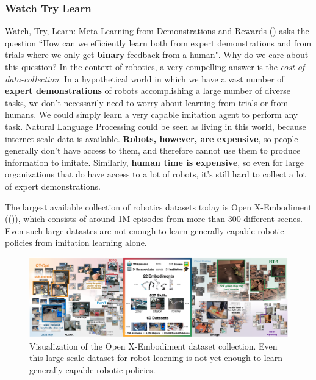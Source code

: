 \documentclass[
  letterpaper,
  DIV=11,
  numbers=noendperiod,
  oneside]{scrreprt}
\theoremstyle{remark}
\begin{document}
\subsubsection*{Watch Try Learn}\label{sec:watch}

Watch, Try, Learn: Meta-Learning from Demonstrations and Rewards
() asks the question ``How
can we efficiently learn both from expert demonstrations and from trials
where we only get \textbf{binary} feedback from a human". Why do we care
about this question? In the context of robotics, a very compelling
answer is the \emph{cost of data-collection}. In a hypothetical world in
which we have a vast number of \textbf{expert demonstrations} of robots
accomplishing a large number of diverse tasks, we don't necessarily need
to worry about learning from trials or from humans. We could simply
learn a very capable imitation agent to perform any task. Natural
Language Processing could be seen as living in this world, because
internet-scale data is available. \textbf{Robots, however, are
expensive}, so people generally don't have access to them, and therefore
cannot use them to produce information to imitate. Similarly,
\textbf{human time is expensive}, so even for large organizations that
do have access to a lot of robots, it's still hard to collect a lot of
expert demonstrations.

The largest available collection of robotics datasets today is Open
X-Embodiment (()),
which consists of around 1M episodes from more than 300 different
scenes. Even such large datastes are not enough to learn
generally-capable robotic policies from imitation learning alone.

\begin{figure}

{\centering \includegraphics{Figures/open_x_embodiment.png}

}

\caption{Visualization of the Open X-Embodiment dataset collection. Even
this large-scale dataset for robot learning is not yet enough to learn
generally-capable robotic policies.}

\end{figure}%
\end{document}
